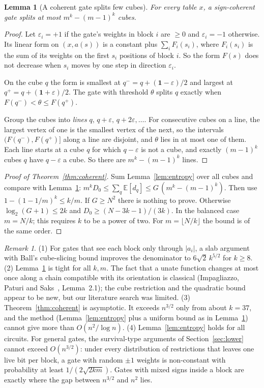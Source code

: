 \documentclass[11pt,letterpaper]{article}
\newtheorem{lemma}[theorem]{Lemma}
\theoremstyle{remark}
\newtheorem*{remark}{Remark}
\begin{document}
\begin{lemma}[A coherent gate splits few cubes]\label{lem:diag}
For every table $x$, a sign-coherent gate splits at most $m^k-(m-1)^k$ cubes.
\end{lemma}
\begin{proof}
Let $\varepsilon_i=+1$ if the gate's weights in block $i$ are $\ge0$ and
$\varepsilon_i=-1$ otherwise. Its linear form on $(x,a(s))$ is a constant plus
$\sum_iF_i(s_i)$, where $F_i(s_i)$ is the sum of its weights on the first
$s_i$ positions of block $i$. So the form $F(s)$ does not decrease when
$s_i$ moves by one step in direction $\varepsilon_i$.

On the cube $q$ the form is smallest at $q^-=q+(\mathbf1-\varepsilon)/2$ and
largest at $q^+=q+(\mathbf1+\varepsilon)/2$. The gate with threshold $\theta$
splits $q$ exactly when $F(q^-)<\theta\le F(q^+)$.

Group the cubes into \emph{lines} $q,\,q+\varepsilon,\,q+2\varepsilon,\dots$.
For consecutive cubes on a line, the largest vertex of one is the smallest
vertex of the next, so the intervals $(F(q^-),F(q^+)]$ along a line are
disjoint, and $\theta$ lies in at most one of them. Each line starts at a cube
$q$ for which $q-\varepsilon$ is not a cube, and exactly $(m-1)^k$ cubes $q$
have $q-\varepsilon$ a cube. So there are $m^k-(m-1)^k$ lines.
\end{proof}

\begin{proof}[Proof of Theorem~\ref{thm:coherent}]
Sum Lemma~\ref{lem:entropy} over all cubes and compare with
Lemma~\ref{lem:diag}: $m^kD_0\le\sum_q\mathbb E[d_q]\le G\,(m^k-(m-1)^k)$.
Then use $1-(1-1/m)^k\le k/m$. If $G\ge N^2$ there is nothing to prove. Otherwise $\log_2(G+1)\le2k$ and
$D_0\ge(N-3k-1)/(3k)$. In the balanced case $m=N/k$; this requires $k$ to be
a power of two. For $m=\lfloor N/k\rfloor$ the bound is of the same order.
\end{proof}

\begin{remark}
(1) For gates that see each block only through $|a_i|$, a slab argument with
Ball's cube-slicing bound improves the denominator to $6\sqrt2\,k^{5/2}$ for
$k\ge8$. (2) Lemma~\ref{lem:diag} is tight for all $k,m$. The fact that a
unate function changes at most once along a chain compatible with its
orientation is classical (Impagliazzo, Paturi and Saks~\cite{IPS},
Lemma~2.1); the cube restriction and the quadratic bound appear to be new,
but our literature search was limited. (3) Theorem~\ref{thm:coherent} is
asymptotic. It exceeds $n^{3/2}$ only from about $k=37$, and the method
(Lemma~\ref{lem:entropy} plus a uniform bound as in Lemma~\ref{lem:diag})
cannot give more than $O(n^2/\log n)$. (4) Lemma~\ref{lem:entropy} holds for
all circuits. For general gates, the survival-type arguments of
Section~\ref{sec:lower} cannot exceed $O(n^{3/2})$: under every
distribution of restrictions that leaves one live bit per block, a gate with
random $\pm1$ weights is non-constant with probability at least
$1/(2\sqrt{2km})$. Gates with mixed signs inside a block are exactly where
the gap between $n^{3/2}$ and $n^2$ lies.
\end{remark}
\end{document}
